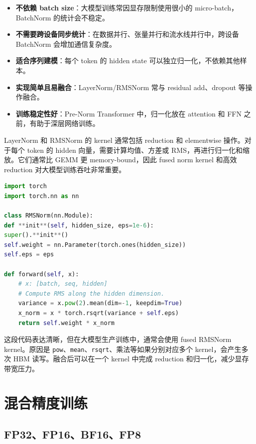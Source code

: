 \begin{itemize}
\item \textbf{不依赖 batch size}：大模型训练常因显存限制使用很小的 micro-batch，BatchNorm 的统计会不稳定。
\item \textbf{不需要跨设备同步统计}：在数据并行、张量并行和流水线并行中，跨设备 BatchNorm 会增加通信复杂度。
\item \textbf{适合序列建模}：每个 token 的 hidden state 可以独立归一化，不依赖其他样本。
\item \textbf{实现简单且易融合}：LayerNorm/RMSNorm 常与 residual add、dropout 等操作融合。
\item \textbf{训练稳定性好}：Pre-Norm Transformer 中，归一化放在 attention 和 FFN 之前，有助于深层网络训练。
\end{itemize}

LayerNorm 和 RMSNorm 的 kernel 通常包括 reduction 和 elementwise 操作。对于每个 token 的 hidden 向量，需要计算均值、方差或 RMS，再进行归一化和缩放。它们通常比 GEMM 更 memory-bound，因此 fused norm kernel 和高效 reduction 对大模型训练吞吐非常重要。

\begin{lstlisting}[language=Python,caption={RMSNorm 的 PyTorch 实现},label={lst:rmsnorm-pytorch}]
import torch
import torch.nn as nn

class RMSNorm(nn.Module):
def **init**(self, hidden_size, eps=1e-6):
super().**init**()
self.weight = nn.Parameter(torch.ones(hidden_size))
self.eps = eps

def forward(self, x):
    # x: [batch, seq, hidden]
    # Compute RMS along the hidden dimension.
    variance = x.pow(2).mean(dim=-1, keepdim=True)
    x_norm = x * torch.rsqrt(variance + self.eps)
    return self.weight * x_norm

\end{lstlisting}

这段代码表达清晰，但在大模型生产训练中，通常会使用 fused RMSNorm kernel。原因是 \texttt{pow}、\texttt{mean}、\texttt{rsqrt}、乘法等如果分别对应多个 kernel，会产生多次 HBM 读写。融合后可以在一个 kernel 中完成 reduction 和归一化，减少显存带宽压力。

\section{混合精度训练}
\label{sec:mixed-precision-training}

\subsection{FP32、FP16、BF16、FP8}
\label{subsec:fp32-fp16-bf16-fp8}

